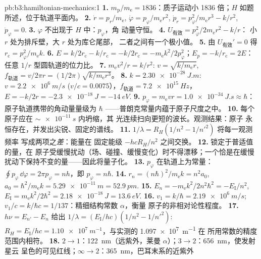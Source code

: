 \begin{solution}{pb:b3:hamiltonian-mechanics:1}
\textbf{1.} $m_{\text{p}}/m_{\text{e}} = 1836$：质子运动小 1836
倍；$H$ 如题所述，位于轨道平面内。
\textbf{2.} $\dot r = p_r/m_{\text{e}}$, $\dot\varphi =
p_\varphi/m_{\text{e}}r^2$, $\dot p_r = p_\varphi^2/m_{\text{e}}r^3 -
k/r^2$, $\dot p_\varphi = 0$.
\textbf{3.} $\varphi$ 不出现于 $H$ 中：$p_\varphi$，角
动量守恒。
\textbf{4.} $U_{\text{有效}} = p_\varphi^2/2m_{\text{e}}r^2 - k/r$：
小 $r$ 处为排斥壁，大 $r$ 处为库仑尾部，
二者之间有一个极小值。
\textbf{5.} 由 $U_{\text{有效}}' = 0$ 得 $r_{\text{c}} =
p_\varphi^2/m_{\text{e}}k$.
\textbf{6.} $E = k/2r_{\text{c}} - k/r_{\text{c}} = -k/2r_{\text{c}} =
-m_{\text{e}}k^2/2p_\varphi^2$；$E_p = -k/r_{\text{c}} = 2E$：
任意 $1/r$ 型圆轨道的位力比。
\textbf{7.} $m_{\text{e}}v^2/r = k/r^2$: $v = \sqrt{k/m_{\text{e}}r}$,
$f_{\text{轨道}} = v/2\pi r = (1/2\pi)\sqrt{k/m_{\text{e}}r^3}$。
\textbf{8.} $k = \qty{2.30e-28}{J.m}$: $v = \qty{2.2e6}{m/s}$ ($v/c =
0.0075$），$f_{\text{轨道}} = \qty{7.2e15}{Hz}$，$E = -k/2r =
\qty{-2.3e-18}{J} = \qty{-14}{eV}$.
\textbf{9.} $p_\varphi = m_{\text{e}}vr = \qty{1.0e-34}{J.s} \approx
\hbar$：原子轨道携带的角动量量级为 $\hbar$
——普朗克常量内蕴于原子尺度之中。
\textbf{10.} 每个原子应在 $\sim\qty{e-11}{s}$ 内坍缩，其
光连续扫向更短的波长。观测结果：原子
永恒存在，并发出尖锐、固定的谱线。
\textbf{11.} $1/\lambda = R_H(1/n^2 - 1/n'^2)$ 将每一观测频率
写成两项之\emph{差}：能量在
固定能级 $-hcR_H/n^2$ 之间交换。
\textbf{12.} 锁定于普适值的量，在
原子受缓慢扰动（场、碰撞、缓慢变化）时不得漂移；一个恰是在缓慢
扰动下保持不变的量——因此将量子化。
\textbf{13.} $p_\varphi$ 在轨道上为常量：$\oint
p_\varphi\,\dd\varphi = 2\pi p_\varphi = nh$，即 $p_\varphi =
n\hbar$.
\textbf{14.} $r_n = (n\hbar)^2/m_{\text{e}}k = n^2a_0$, $a_0 =
\hbar^2/m_{\text{e}}k = \qty{5.29e-11}{m} = \qty{52.9}{pm}$.
\textbf{15.} $E_n = -m_{\text{e}}k^2/2n^2\hbar^2 = -E_{\text{I}}/n^2$,
$E_{\text{I}} = m_{\text{e}}k^2/2\hbar^2 = \qty{2.18e-18}{J} =
\qty{13.6}{eV}$.
\textbf{16.} $v_1 = k/\hbar = \qty{2.19e6}{m/s}$; $v_1/c = k/\hbar c =
1/137$：精细结构常数 $\alpha$，衡量
原子的非相对论性程度。
\textbf{17.} $h\nu = E_{n'} - E_n$ 给出 $1/\lambda =
(E_{\text{I}}/hc)(1/n^2 - 1/n'^2)$: $R_H = E_{\text{I}}/hc =
\qty{1.10e7}{m^{-1}}$，与实测的 \qty{1.097e7}{m^{-1}} 在
所用常数的精度范围内相符。
\textbf{18.} $2 \to 1$：\qty{122}{nm}（远紫外，莱曼
$\alpha$）；$3 \to 2$：\qty{656}{nm}，使发射星云
呈色的可见红线；$\infty \to 2$：\qty{365}{nm}，巴耳末系的近紫外

\end{solution}

